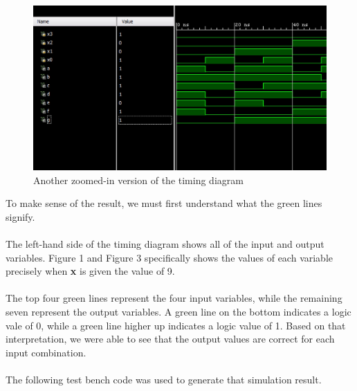 \documentclass{article}
\begin{document}
\clearpage

\begin{figure}[h!]
\centering
\includegraphics[scale=0.4]{Timing_Diagram-Magnified_IO}
\caption{Another zoomed-in version of the timing diagram}
\end{figure}

To make sense of the result, we must first understand what the green lines 
signify.\\
\\
The left-hand side of the timing diagram shows all of the input and output 
variables. Figure 1 and Figure 3 specifically shows the values of each variable 
precisely when \textbf{x} is given the value of 9. \\
\\
The top four green lines represent the four input variables, while the 
remaining seven represent the output variables. A green line on the bottom 
indicates a logic vale of 0, while a green line higher up indicates a logic 
value of 1.  Based on that interpretation, we were able to see that the output 
values are correct for each input combination.\\
\\
The following test bench code was used to generate that simulation result.
\end{document}
